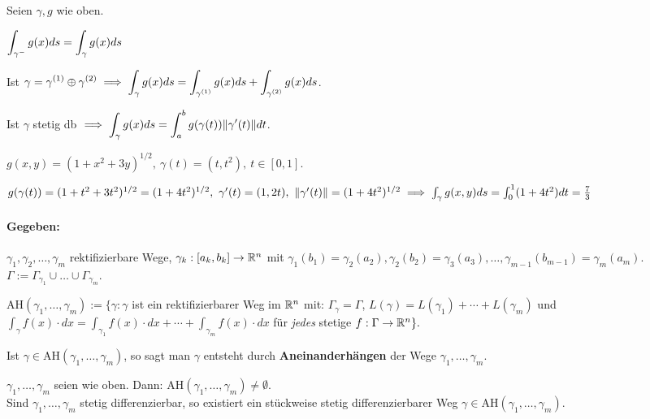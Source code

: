 \documentclass[a4paper,twoside,DIV15,BCOR12mm,chapterprefix=true,headings=twolinechapter]{scrbook}
\begin{document}
\begin{satz}
Seien $\gamma,g$ wie oben.
\begin{liste}
\item $\displaystyle{\int_{\gamma^-} g(x) ds = \int_\gamma g(x) ds}$
\item Ist $\displaystyle{\gamma = \gamma^{(1)} \oplus \gamma^{(2)} \ensuremath{\implies}\int_\gamma g(x)ds = \int_{\gamma^{(1)}} g(x)ds + \int_{\gamma^{(2)}} g(x)ds}$.
\item Ist $\gamma$ stetig db $\implies \displaystyle{\int_\gamma g(x)ds = \int_a^b g(\gamma(t))\|\gamma'(t)\|dt}$.
\end{liste}
\end{satz}

\begin{beispiel}
$g(x,y) = (1+x^2+3y)^{1/2},\ \gamma(t) = (t,t^2),\ t\in[0,1].$

$g(\gamma(t)) = (1+t^2+3t^2)^{1/2} = (1+4t^2)^{1/2},\ \gamma'(t) = (1, 2t),\ \|\gamma'(t)\| = (1+4t^2)^{1/2} \implies \int_\gamma g(x,y)ds = \int_0^1 (1+4t^2) dt = \frac{7}{3}$
\end{beispiel}

\paragraph{Gegeben:} $\gamma_1,\gamma_2,\ldots,\gamma_m$ rektifizierbare Wege, $\gamma_k:[a_k,b_k]\to\mathbb{R}^n$ mit $\gamma_1(b_1) = \gamma_2(a_2), \gamma_2(b_2) = \gamma_3(a_3),\ldots , \gamma_{m-1}(b_{m-1}) = \gamma_m(a_m)$. $\Gamma := \Gamma_{\gamma_1} \cup \ldots \cup \Gamma_{\gamma_m}$.

$\text{AH}(\gamma_1,\ldots,\gamma_m) := \{\gamma:\gamma$ ist ein rektifizierbarer Weg im $\mathbb{R}^n$ mit: $\Gamma_\gamma=\Gamma$, $L(\gamma)=L(\gamma_1)+\cdots+L(\gamma_m)$ und $\int_\gamma f(x)\cdot dx = \int_{\gamma_1}f(x)\cdot dx+ \cdots + \int_{\gamma_m}f(x)\cdot dx$ für \emph{jedes} stetige $f:\Gamma\to\mathbb{R}^n\}.$

Ist $\gamma\in \text{AH}(\gamma_1,\ldots,\gamma_m)$, so sagt man $\gamma$ entsteht durch \textbf{Aneinanderhängen} der Wege $\gamma_1,\ldots,\gamma_m$.

\begin{satz}
$\gamma_1,\ldots,\gamma_m$ seien wie oben. Dann: $\text{AH}(\gamma_1,\ldots,\gamma_m) \ne \emptyset$. \\
Sind $\gamma_1,\ldots,\gamma_m$ stetig differenzierbar, so existiert ein stückweise stetig differenzierbarer Weg $\gamma\in \text{AH}(\gamma_1,\ldots,\gamma_m)$.
\end{satz}
\end{document}
